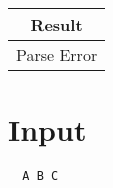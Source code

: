\documentclass{article}
\newcommand{\xmark}{\textcolor{red}{\ding{56}}}%
\begin{document}
\begin{tabular}{|c|}
  \hline
  \cellcolor[gray]{0.8}
  \begin{minipage}{10cm}
    \centering
    Result
  \end{minipage}
  \\\hline

  {
    \huge
    \xmark
    Parse Error
  }
  \\\hline
\end{tabular}

\section*{Input}

\begin{lstlisting}
  A B C
\end{lstlisting}
\end{document}
